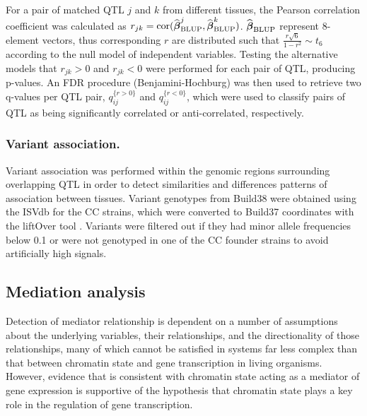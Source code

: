 For a pair of matched QTL $j$ and $k$ from different tissues, the Pearson correlation coefficient was calculated as $r_{jk} = \text{cor}(\widehat{\boldsymbol{\beta}}_{\text{BLUP}}^{j}, \widehat{\boldsymbol{\beta}}_{\text{BLUP}}^{k})$. $\widehat{\boldsymbol{\beta}}_{\text{BLUP}}$ represent 8-element vectors, thus corresponding $r$ are distributed such that $\frac{r\sqrt{6}}{1 - r^{2}} \sim t_{6}$ according to the null model of independent variables. Testing the alternative models that $r_{jk} > 0$ and $r_{jk} < 0$ were performed for each pair of QTL, producing p-values. An FDR procedure (Benjamini-Hochburg) was then used to retrieve two q-values per QTL pair, $q_{ij}^{\{r > 0\}}$ and $q_{ij}^{\{r < 0\}}$, which were used to classify pairs of QTL as being significantly correlated or anti-correlated, respectively. 

\subsubsection{Variant association.}

Variant association was performed within the genomic regions surrounding overlapping QTL in order to detect similarities and differences patterns of association between tissues. Variant genotypes from Build38 were obtained using the ISVdb \citep{Oreper2017} for the CC strains, which were converted to Build37 coordinates with the liftOver tool \citep{Lawrence2009}. Variants were filtered out if they had minor allele frequencies below 0.1 or were not genotyped in one of the CC founder strains to avoid artificially high signals.

\subsection{Mediation analysis}

Detection of mediator relationship is dependent on a number of assumptions about the underlying variables, their relationships, and the directionality of those relationships, many of which cannot be satisfied in systems far less complex than that between chromatin state and gene transcription in living organisms. However, evidence that is consistent with chromatin state acting as a mediator of gene expression is supportive of the hypothesis that chromatin state plays a key role in the regulation of gene transcription.

